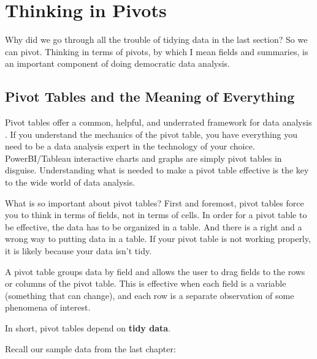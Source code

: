 \documentclass[
]{book}
\begin{document}
\hypertarget{thinking-in-pivots}{%
\chapter{Thinking in Pivots}\label{thinking-in-pivots}}

Why did we go through all the trouble of tidying data in the last section? So we can pivot. Thinking in terms of pivots, by which I mean fields and summaries, is an important component of doing democratic data analysis.

\hypertarget{pivot-tables-and-the-meaning-of-everything}{%
\section{Pivot Tables and the Meaning of Everything}\label{pivot-tables-and-the-meaning-of-everything}}

Pivot tables offer a common, helpful, and underrated framework for data analysis . If you understand the mechanics of the pivot table, you have everything you need to be a data analysis expert in the technology of your choice. PowerBI/Tableau interactive charts and graphs are simply pivot tables in disguise. Understanding what is needed to make a pivot table effective is the key to the wide world of data analysis.

What is so important about pivot tables? First and foremost, pivot tables force you to think in terms of fields, not in terms of cells. In order for a pivot table to be effective, the data has to be organized in a table. And there is a right and a wrong way to putting data in a table. If your pivot table is not working properly, it is likely because your data isn't tidy.

A pivot table groups data by field and allows the user to drag fields to the rows or columns of the pivot table. This is effective when each field is a variable (something that can change), and each row is a separate observation of some phenomena of interest.

In short, pivot tables depend on \textbf{tidy data}.

Recall our sample data from the last chapter:
\end{document}
